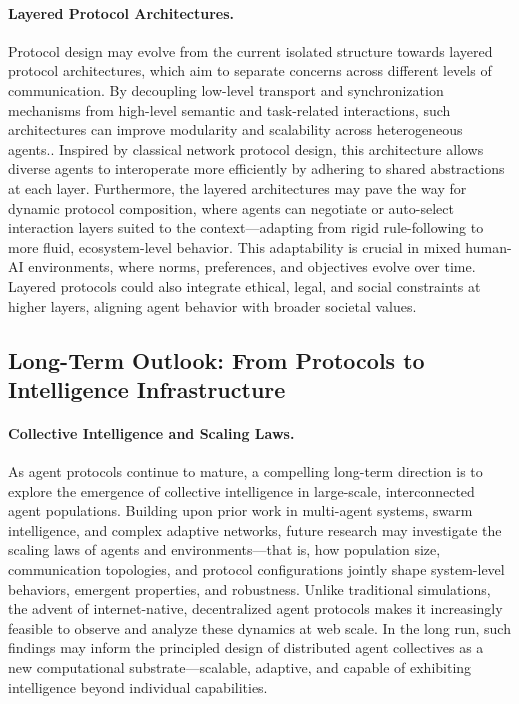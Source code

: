 \documentclass[10pt,preprint]{article}
\begin{document}
\paragraph{Layered Protocol Architectures.}
Protocol design may evolve from the current isolated structure towards layered protocol architectures, which aim to separate concerns across different levels of communication. 
By decoupling low-level transport and synchronization mechanisms from high-level semantic and task-related interactions, such architectures can improve modularity and scalability across heterogeneous agents.. 
Inspired by classical network protocol design, this architecture allows diverse agents to interoperate more efficiently by adhering to shared abstractions at each layer. 
Furthermore, the layered architectures may pave the way for dynamic protocol composition, where agents can negotiate or auto-select interaction layers suited to the context—adapting from rigid rule-following to more fluid, ecosystem-level behavior. 
This adaptability is crucial in mixed human-AI environments, where norms, preferences, and objectives evolve over time. 
Layered protocols could also integrate ethical, legal, and social constraints at higher layers, aligning agent behavior with broader societal values.




\subsection{Long-Term Outlook: From Protocols to Intelligence Infrastructure}

\paragraph{Collective Intelligence and Scaling Laws.}

As agent protocols continue to mature, a compelling long-term direction is to explore the emergence of collective intelligence in large-scale, interconnected agent populations. Building upon prior work in multi-agent systems, swarm intelligence, and complex adaptive networks, future research may investigate the scaling laws of agents and environments—that is, how population size, communication topologies, and protocol configurations jointly shape system-level behaviors, emergent properties, and robustness. Unlike traditional simulations, the advent of internet-native, decentralized agent protocols makes it increasingly feasible to observe and analyze these dynamics at web scale. In the long run, such findings may inform the principled design of distributed agent collectives as a new computational substrate—scalable, adaptive, and capable of exhibiting intelligence beyond individual capabilities.
\end{document}
